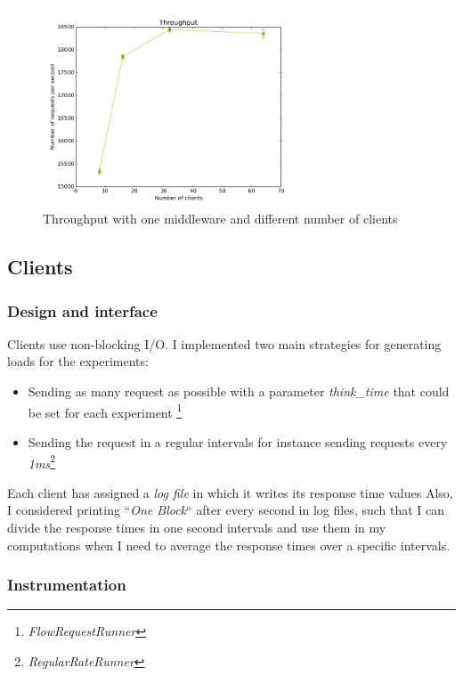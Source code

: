 \documentclass[11pt]{article}
\begin{document}
\begin{figure}[H]
  \includegraphics[width=0.7\textwidth,page=1]{figures/middleware-throughput}
  \centering
  \caption{Throughput with one middleware and different number of clients}
  \label{fig:middleware-throughput}
\end{figure}


\subsection{Clients}\label{sec:clients}

\subsubsection{Design and interface}\label{sec:design-and-interface}
Clients use non-blocking I/O. I implemented two main strategies for generating loads
for the experiments:
\begin{itemize}
 \item Sending as many request as possible with a parameter \emph{think\_time}
 that could be set for each experiment \footnote{\emph{FlowRequestRunner}}
 \item Sending the request in a regular intervals for instance sending requests
 every \emph{1ms}\footnote{\emph{RegularRateRunner}}
\end{itemize}
Each client has assigned a \emph{log file} in which it writes its response time values
Also, I considered printing ``\emph{One Block}`` after every second in log files,
such that I can divide the response times in one second intervals and use them in 
my computations when I need to average the response times over a specific intervals.


\subsubsection{Instrumentation}\label{sec:instrumentation}
\end{document}
